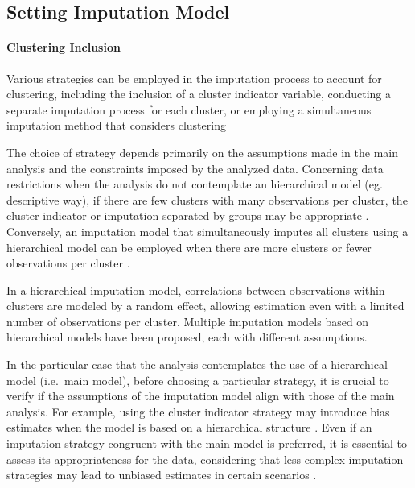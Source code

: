 \documentclass[
  article]{jss}
\let\oldparagraph\paragraph
\renewcommand{\paragraph}[1]{\oldparagraph{#1}\mbox{}}
\begin{document}
\hypertarget{setting-imputation-model}{%
\subsection{Setting Imputation Model}\label{setting-imputation-model}}

\hypertarget{clustering-inclusion}{%
\paragraph{Clustering Inclusion}\label{clustering-inclusion}}

Various strategies can be employed in the imputation process to account
for clustering, including the inclusion of a cluster indicator variable,
conducting a separate imputation process for each cluster, or employing
a simultaneous imputation method that considers clustering\cite{eddings}

The choice of strategy depends primarily on the assumptions made in the
main analysis and the constraints imposed by the analyzed data.
Concerning data restrictions when the analysis do not contemplate an
hierarchical model (eg. descriptive way), if there are few clusters with
many observations per cluster, the cluster indicator or imputation
separated by groups may be appropriate \cite{graham2009}. Conversely, an
imputation model that simultaneously imputes all clusters using a
hierarchical model can be employed when there are more clusters or fewer
observations per cluster \cite{Allison_2002}.

In a hierarchical imputation model, correlations between observations
within clusters are modeled by a random effect, allowing estimation even
with a limited number of observations per cluster. Multiple imputation
models based on hierarchical models have been proposed, each with
different assumptions. \cite{audigier}

In the particular case that the analysis contemplates the use of a
hierarchical model (i.e.~main model), before choosing a particular
strategy, it is crucial to verify if the assumptions of the imputation
model align with those of the main analysis. For example, using the
cluster indicator strategy may introduce bias estimates when the model
is based on a hierarchical structure \cite{taljaard2008,speidel2018}.
Even if an imputation strategy congruent with the main model is
preferred, it is essential to assess its appropriateness for the data,
considering that less complex imputation strategies may lead to unbiased
estimates in certain scenarios \cite{bailey2020}.
\end{document}
